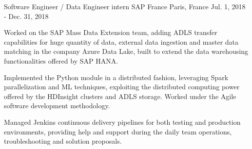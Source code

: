 

\begin{cventries}

  \cventry
    {Software Engineer / Data Engineer intern} %
    {SAP France} %
    {Paris, France} %
    {Jul. 1, 2018 - Dec. 31, 2018} %
    {
      \begin{cvitems} %
        \item {Worked on the SAP Mass Data Extension team, adding ADLS transfer capabilities for huge quantity of data, external data ingestion and master data matching in the company Azure Data Lake, built to extend the data warehousing functionalities offered by SAP HANA.}
        \item {Implemented the Python module in a distributed fashion, leveraging Spark parallelization and ML techniques, exploiting the distributed computing power offered by the HDInsight clusters and ADLS storage. Worked under the Agile software development methodology.}
        \item {Managed Jenkins continuous delivery pipelines for both testing and production environments, providing help and support during the daily team operations, troubleshooting and solution proposals.}
      \end{cvitems}
    }
\end{cventries}
